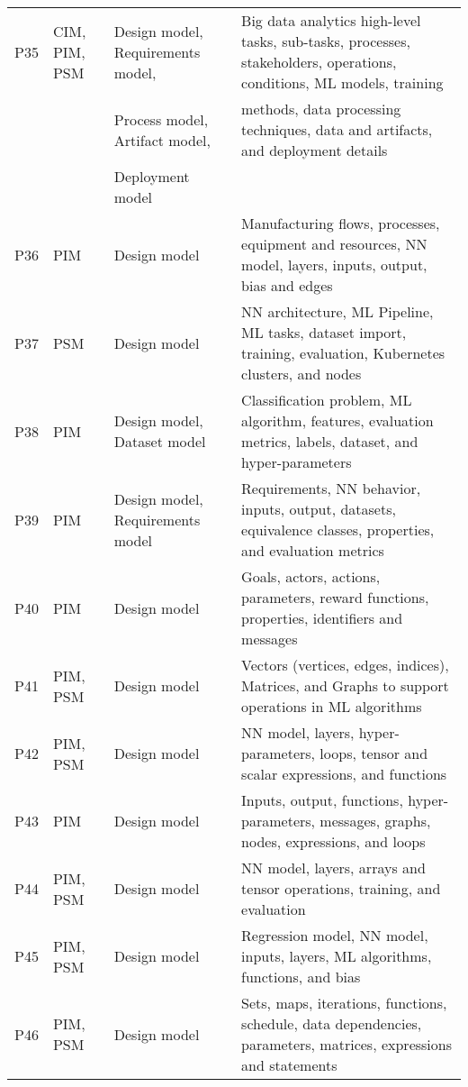 \begin{table}[htbp]
{\begin{tabular}{l l l l }
            \TBstrut P35 \TBstrut	& CIM, PIM, PSM & Design model, Requirements model, & Big data analytics high-level tasks, sub-tasks, processes, stakeholders, operations, conditions, ML models, training  \TBstrut\\
            \TBstrut \TBstrut       &        & Process model, Artifact model, & methods, data processing techniques, data and artifacts, and deployment details\TBstrut \\
            \TBstrut \TBstrut       &        & Deployment model & \TBstrut \\
            \TBstrut P36 \TBstrut	& PIM    & Design model  & Manufacturing flows, processes, equipment and resources, NN model, layers, inputs, output, bias and edges\TBstrut \\
            \TBstrut P37 \TBstrut	& PSM    & Design model  & NN architecture, ML Pipeline, ML tasks, dataset import, training, evaluation, Kubernetes clusters, and nodes \TBstrut \\
            \TBstrut P38 \TBstrut	& PIM    & Design model, Dataset model & Classification problem, ML algorithm, features, evaluation metrics, labels, dataset, and hyper-parameters\TBstrut \\
            \TBstrut P39 \TBstrut	& PIM    & Design model, Requirements model & Requirements, NN behavior, inputs, output, datasets, equivalence classes, properties, and evaluation metrics \TBstrut \\
            \TBstrut P40 \TBstrut	& PIM    & Design model  & Goals, actors, actions, parameters, reward functions, properties, identifiers and messages \TBstrut \\
            \TBstrut P41 \TBstrut	& PIM, PSM  & Design model  & Vectors (vertices, edges, indices), Matrices, and Graphs to support operations in ML algorithms \TBstrut \\
            \TBstrut P42 \TBstrut	& PIM, PSM  & Design model  & NN model, layers, hyper-parameters, loops, tensor and scalar expressions, and functions\TBstrut \\
            \TBstrut P43 \TBstrut	& PIM    & Design model  & Inputs, output, functions, hyper-parameters, messages, graphs, nodes, expressions, and loops \TBstrut \\
            \TBstrut P44 \TBstrut	& PIM, PSM  & Design model  & NN model, layers, arrays and tensor operations, training, and evaluation\TBstrut \\
            \TBstrut P45 \TBstrut	& PIM, PSM  & Design model  & Regression model, NN model, inputs, layers, ML algorithms, functions, and bias \TBstrut \\
            \TBstrut P46 \TBstrut	& PIM, PSM  & Design model  & Sets, maps, iterations, functions, schedule, data dependencies, parameters, matrices, expressions and  statements
\TBstrut \\
            \hline
        \end{tabular}
        }
    \label{table:modelinfo}
\end{table}

